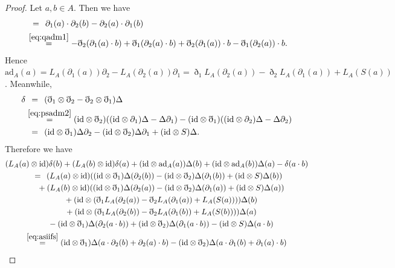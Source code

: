 \documentclass[pdftex]{sigma}
\numberwithin{equation}{section}
\newcommand{\ad}{\mathrm{ad}}
\newcommand{\id}{\mathrm{id}}
\begin{document}
\begin{proof} Let $a, b \in A$. Then we have
 \begin{align*}
 [a,b] &\overset{\hphantom{(2.7)}}{=} \partial_1(a) \cdot \partial_2(b) - \partial_2(a) \cdot \partial_1(b) \\
 & \overset{\eqref{eq:qadm1}}{=} -\eth_2(\partial_1(a) \cdot b) + \eth_1(\partial_2(a) \cdot b) + \eth_2(\partial_1(a)) \cdot b - \eth_1(\partial_2(a)) \cdot b.
 \end{align*}
 Hence $\ad_A(a) = L_A(\partial_1(a))\partial_2 - L_A(\partial_2(a))\partial_1 = \eth_1 L_A(\partial_2(a)) - \eth_2 L_A(\partial_1(a)) + L_A(S(a))$. Meanwhile,
 \begin{align*}
 \delta &\overset{\hphantom{(3.6)}}{=} (\eth_1 \otimes \eth_2 - \eth_2 \otimes \eth_1)\Delta \\
 &\overset{\eqref{eq:psadm2}}{=}(\id \otimes \eth_2)( (\id \otimes \partial_1 )\Delta - \Delta \partial_1) - (\id \otimes \eth_1)( (\id \otimes \partial_2)\Delta - \Delta \partial_2) \\
 &\overset{\hphantom{(3.6)}}{=} (\id \otimes \eth_1)\Delta \partial_2 - (\id \otimes \eth_2)\Delta \partial_1 + (\id \otimes S)\Delta.
 \end{align*}
 Therefore we have
 \begin{gather*}
 (L_A(a) \otimes \id)\delta(b) + (L_A(b) \otimes \id)\delta(a) + (\id \otimes \ad_A(a))\Delta(b) +(\id \otimes \ad_A(b))\Delta(a) -\delta(a \cdot b) \\
 \overset{\hphantom{(3.2)}}{=} (L_A(a) \otimes \id)( (\id \otimes \eth_1)\Delta(\partial_2(b)) -(\id \otimes \eth_2)\Delta(\partial_1(b)) + (\id \otimes S)\Delta (b)) \\
 \quad {}+ (L_A(b) \otimes \id)( (\id \otimes \eth_1)\Delta(\partial_2(a))-(\id \otimes \eth_2)\Delta(\partial_1(a)) + (\id \otimes S)\Delta (a) ) \\
 \quad {}+ (\id \otimes (\eth_1 L_A(\partial_2(a)) -\eth_2 L_A(\partial_1(a)) + L_A(S(a)) ) )\Delta(b) \\
 \quad {}+ (\id \otimes (\eth_1 L_A(\partial_2(b)) -\eth_2 L_A(\partial_1(b)) + L_A(S(b)) ) )\Delta(a) \\
 \quad {}- (\id \otimes \eth_1)\Delta(\partial_2(a \cdot b)) + (\id \otimes \eth_2)\Delta(\partial_1(a \cdot b)) - (\id \otimes S)\Delta(a \cdot b) \\
 \overset{\eqref{eq:asiifs}}{=} (\id \otimes \eth_1) \Delta(a \cdot \partial_2(b) + \partial_2(a) \cdot b ) - (\id \otimes \eth_2) \Delta(a \cdot \partial_1(b)+ \partial_1(a) \cdot b) \\

\end{gather*}
\end{proof}
\end{document}
